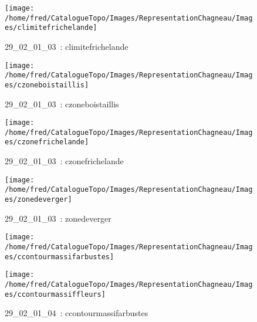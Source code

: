 \documentclass[12pt,titlepage]{book}
\begin{document}
\begin{figure}[h!]
\begin{minipage}[t]{3cm}
\begin{center}
      \texttt{[image: /home/fred/CatalogueTopo/Images/RepresentationChagneau/Images/climitefrichelande]}
      \caption[~29\_02\_01\_03]{\small{29\_02\_01\_03~:} \tiny{climitefrichelande}}\label{climitefrichelande}
    \end{center}
  \end{minipage}
  \begin{minipage}[t]{3cm}
    \begin{center}
      \texttt{[image: /home/fred/CatalogueTopo/Images/RepresentationChagneau/Images/czoneboistaillis]}
      \caption[~29\_02\_01\_03]{\small{29\_02\_01\_03~:} \tiny{czoneboistaillis}}\label{czoneboistaillis}
    \end{center}
  \end{minipage}
  \begin{minipage}[t]{3cm}
    \begin{center}
      \texttt{[image: /home/fred/CatalogueTopo/Images/RepresentationChagneau/Images/czonefrichelande]}
      \caption[~29\_02\_01\_03]{\small{29\_02\_01\_03~:} \tiny{czonefrichelande}}\label{czonefrichelande}
    \end{center}
  \end{minipage}
  \begin{minipage}[t]{3cm}
    \begin{center}
      \texttt{[image: /home/fred/CatalogueTopo/Images/RepresentationChagneau/Images/zonedeverger]}
      \caption[~29\_02\_01\_03]{\small{29\_02\_01\_03~:} \tiny{zonedeverger}}\label{zonedeverger}
    \end{center}
  \end{minipage}
  \begin{minipage}[t]{3cm}
    \begin{center}
      \texttt{[image: /home/fred/CatalogueTopo/Images/RepresentationChagneau/Images/ccontourmassifarbustes]}
      \caption[~29\_02\_01\_04]{\small{29\_02\_01\_04~:} \tiny{ccontourmassifarbustes}}\label{ccontourmassifarbustes}
    \end{center}
  \end{minipage}
  \begin{minipage}[t]{3cm}
    \begin{center}
      \texttt{[image: /home/fred/CatalogueTopo/Images/RepresentationChagneau/Images/ccontourmassiffleurs]}

\end{center}
\end{minipage}
\end{figure}
\end{document}
